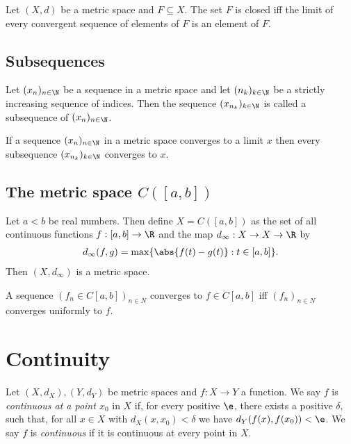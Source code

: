 \documentclass{article}
\begin{document}
\begin{proposition}[Notes 5.10]
    Let $(X,d)$ be a metric space and $F\subseteq X$. The set $F$ is closed iff the limit of 
    every convergent sequence of elements of $F$ is an element of $F$.
\end{proposition}

\subsection{Subsequences}

\begin{definition}
    Let $(x_n)_{n\in\N}$ be a sequence in a metric space and let $(n_k)_{k\in\N}$ be a strictly
    increasing sequence of indices. Then the sequence $(x_{n_k})_{k\in\N}$ is called 
    a subsequence of $(x_n)_{n\in\N}$.
\end{definition}

\begin{proposition}
    If a sequence $(x_n)_{n\in\N}$ in a metric space converges to a limit $x$ then every subsequence
    $(x_{n_k})_{k\in\N}$ converges to $x$.
\end{proposition}

\subsection{The metric space $C([a,b])$}

\begin{theorem}
    Let $a<b$ be real numbers. Then define $X=C([a,b])$ as the set of all continuous functions 
    $f:[a,b]\to\R$ and the map $d_\infty:X\to X\to\R$ by 
    \begin{align*}
        d_\infty(f,g) = \max\{\abs{f(t)-g(t)}: t\in[a,b]\}.
    \end{align*}
    Then $(X,d_\infty)$ is a metric space.
\end{theorem}

\begin{lemma}
    A sequence $(f_n\in C[a,b])_{n\in N}$ converges to $f\in C[a,b]$ iff $(f_n)_{n\in N}$
    converges uniformly to $f$.
\end{lemma}

\section{Continuity}

\begin{definition}
    Let $(X,d_X),(Y,d_Y)$ be metric spaces and $f:X\to Y$ a function. We say $f$ is \emph{continuous
    at a point $x_0$} in $X$ if, for every positive $\e$, there exists a positive $\delta$, such that,
    for all $x\in X$ with $d_X(x,x_0)<\delta$ we have $d_Y(f(x),f(x_0))<\e$.
    We say $f$ is \emph{continuous} if it is continuous at every point in $X$.
\end{definition}
\end{document}
